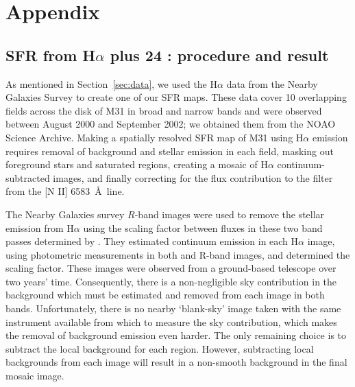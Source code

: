 \chapter{Appendix}
\section{SFR from H$\alpha$ plus 24 \um: procedure and result}
\label{app:halpha}

As mentioned in Section~\ref{sec:data}, we used the H$\alpha$ data from the Nearby Galaxies Survey \citep{Massey07} to create one of our SFR maps. These data cover 10 overlapping fields across the disk of M31 in broad and narrow bands and were observed between August 2000 and September 2002; we obtained them  from the NOAO Science Archive. Making a spatially resolved SFR map of M31 using H$\alpha$ emission requires removal of background and stellar emission in each field, masking out foreground stars and saturated regions, creating a mosaic of H$\alpha$ continuum-subtracted images, and finally correcting for the flux contribution to the \halpha filter from the [N II] 6583~\AA\ line.

The Nearby Galaxies survey $R$-band images were used to remove the stellar emission from H$\alpha$ using the scaling factor between fluxes in these two band passes determined by \citet{Azimlu11}. They estimated continuum emission in each H$\alpha$ image, using photometric measurements in both \halpha and R-band images, and determined the scaling factor. These images were observed from a ground-based telescope over two years' time. Consequently, there is a non-negligible sky contribution in the background which must be estimated and removed from each image in both bands. Unfortunately, there is no nearby `blank-sky' image taken with the same instrument available from which to measure the sky contribution, which makes the removal of background emission even harder. The only remaining choice is to subtract the local background for each region. However, subtracting local backgrounds from each image will result in a non-smooth background in the final mosaic image. 


